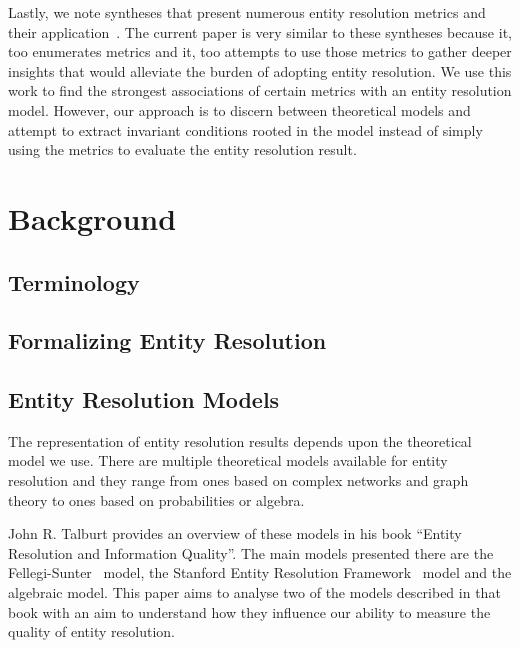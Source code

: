 \documentclass[journal]{IEEEtran}
\begin{document}
    Lastly, we note syntheses that present numerous entity resolution metrics
    and their application~\cite{hitesh2012,graf2021frost,barnes2015practioner}.
    The current paper is very similar to these syntheses because it, too
    enumerates metrics and it, too attempts to use those metrics to gather
    deeper insights that would alleviate the burden of adopting entity
    resolution.
    We use this work to find the strongest associations of certain metrics with
    an entity resolution model.
    However, our approach is to discern between theoretical models and attempt
    to extract invariant conditions rooted in the model instead of simply using
    the metrics to evaluate the entity resolution result.

    \section{Background}\label{sec:Theoretical Background}
    \subsection{Terminology}\label{sec:Terminology}
    
    
    \subsection{Formalizing Entity Resolution}\label{sec:Entity Resolution Formalization}
    

    \subsection{Entity Resolution Models}\label{subsec:Entity Resolution Models}

    The representation of entity resolution results depends upon the theoretical
    model we use.
    There are multiple theoretical models available for entity resolution and
    they range from ones based on complex networks and graph theory\cite{Li2020}
    to ones based on probabilities\cite{fs1969} or
    algebra\cite{Tal11,Ben2009Swoosh}.

    John R. Talburt provides an overview of these models in his book ``Entity
    Resolution and Information Quality''\cite{Tal11}.
    The main models presented there are the Fellegi-Sunter~\cite{fs1969} model,
    the Stanford Entity Resolution Framework~\cite{Ben2009Swoosh} model and the
    algebraic\cite{tal2007algebraic} model.
    This paper aims to analyse two of the models described in that book with an
    aim to understand how they influence our ability to measure the quality of
    entity resolution.
\end{document}
